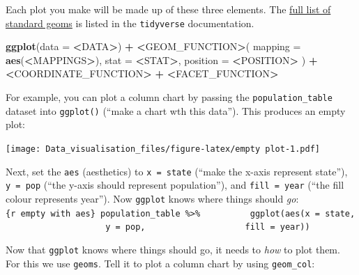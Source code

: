 \documentclass[]{book}
\newenvironment{Shaded}{\begin{snugshade}}{\end{snugshade}}
\newcommand{\DataTypeTok}[1]{\textcolor[rgb]{0.13,0.29,0.53}{#1}}
\newcommand{\ErrorTok}[1]{\textcolor[rgb]{0.64,0.00,0.00}{\textbf{#1}}}
\newcommand{\KeywordTok}[1]{\textcolor[rgb]{0.13,0.29,0.53}{\textbf{#1}}}
\newcommand{\NormalTok}[1]{#1}
\newcommand{\OperatorTok}[1]{\textcolor[rgb]{0.81,0.36,0.00}{\textbf{#1}}}
\newcommand{\StringTok}[1]{\textcolor[rgb]{0.31,0.60,0.02}{#1}}
\begin{document}
Each plot you make will be made up of these three elements. The \href{https://ggplot2.tidyverse.org/reference/}{full list of standard geoms} is listed in the \texttt{tidyverse} documentation.

\begin{Shaded}
\begin{Highlighting}[]
\KeywordTok{ggplot}\NormalTok{(}\DataTypeTok{data =} \OperatorTok{<}\NormalTok{DATA}\OperatorTok{>}\NormalTok{) }\OperatorTok{+}\StringTok{ }
\StringTok{  }\ErrorTok{<}\NormalTok{GEOM_FUNCTION}\OperatorTok{>}\NormalTok{(}
     \DataTypeTok{mapping =} \KeywordTok{aes}\NormalTok{(}\OperatorTok{<}\NormalTok{MAPPINGS}\OperatorTok{>}\NormalTok{),}
     \DataTypeTok{stat =} \OperatorTok{<}\NormalTok{STAT}\OperatorTok{>}\NormalTok{, }
     \DataTypeTok{position =} \OperatorTok{<}\NormalTok{POSITION}\OperatorTok{>}
\StringTok{  }\NormalTok{) }\OperatorTok{+}
\StringTok{  }\ErrorTok{<}\NormalTok{COORDINATE_FUNCTION}\OperatorTok{>}\StringTok{ }\OperatorTok{+}
\StringTok{  }\ErrorTok{<}\NormalTok{FACET_FUNCTION}\OperatorTok{>}
\end{Highlighting}
\end{Shaded}

For example, you can plot a column chart by passing the \texttt{population\_table} dataset into \texttt{ggplot()} (``make a chart wth this data''). This produces an empty plot:

\begin{Shaded}
\end{Shaded}

\texttt{[image: Data\_visualisation\_files/figure-latex/empty plot-1.pdf]}

Next, set the \texttt{aes} (aesthetics) to \texttt{x\ =\ state} (``make the x-axis represent state''), \texttt{y\ =\ pop} (``the y-axis should represent population''), and \texttt{fill\ =\ year} (``the fill colour represents year''). Now \texttt{ggplot} knows where things should \emph{go}:\texttt{\{r\ empty\ with\ aes\}\ population\_table\ \%\textgreater{}\%\ \ \ \ \ \ \ \ \ \ ggplot(aes(x\ =\ state,\ \ \ \ \ \ \ \ \ \ \ \ \ \ \ \ \ \ \ \ y\ =\ pop,\ \ \ \ \ \ \ \ \ \ \ \ \ \ \ \ \ \ \ \ fill\ =\ year))}

Now that \texttt{ggplot} knows where things should go, it needs to \emph{how} to plot them. For this we use \texttt{geoms}. Tell it to plot a column chart by using \texttt{geom\_col}:
\end{document}
